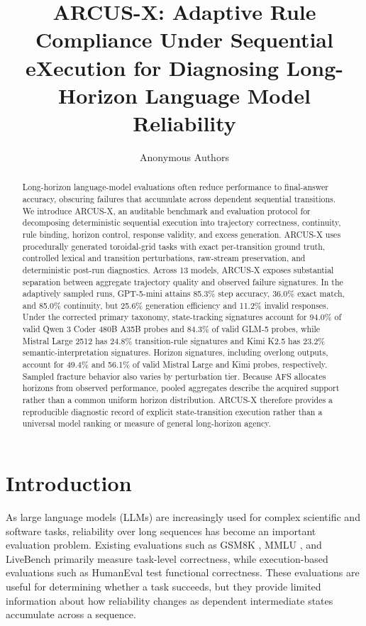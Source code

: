 \documentclass{article}
\title{ARCUS-X: Adaptive Rule Compliance Under Sequential eXecution for Diagnosing Long-Horizon Language Model Reliability}
\author{Anonymous Authors}
\begin{document}
\maketitle

\begin{abstract}
Long-horizon language-model evaluations often reduce performance to final-answer accuracy, obscuring failures that accumulate across dependent sequential transitions. We introduce ARCUS-X, an auditable benchmark and evaluation protocol for decomposing deterministic sequential execution into trajectory correctness, continuity, rule binding, horizon control, response validity, and excess generation. ARCUS-X uses procedurally generated toroidal-grid tasks with exact per-transition ground truth, controlled lexical and transition perturbations, raw-stream preservation, and deterministic post-run diagnostics. Across 13 models, ARCUS-X exposes substantial separation between aggregate trajectory quality and observed failure signatures. In the adaptively sampled runs, GPT-5-mini attains 85.3\% step accuracy, 36.0\% exact match, and 85.0\% continuity, but 25.6\% generation efficiency and 11.2\% invalid responses. Under the corrected primary taxonomy, state-tracking signatures account for 94.0\% of valid Qwen 3 Coder 480B A35B probes and 84.3\% of valid GLM-5 probes, while Mistral Large 2512 has 24.8\% transition-rule signatures and Kimi K2.5 has 23.2\% semantic-interpretation signatures. Horizon signatures, including overlong outputs, account for 49.4\% and 56.1\% of valid Mistral Large and Kimi probes, respectively. Sampled fracture behavior also varies by perturbation tier. Because AFS allocates horizons from observed performance, pooled aggregates describe the acquired support rather than a common uniform horizon distribution. ARCUS-X therefore provides a reproducible diagnostic record of explicit state-transition execution rather than a universal model ranking or measure of general long-horizon agency.

\end{abstract}

\section{Introduction}

As large language models (LLMs) are increasingly used for complex scientific and software tasks, reliability over long sequences has become an important evaluation problem. Existing evaluations such as GSM8K \cite{cobbe2021gsm8k}, MMLU \cite{hendrycks2020mmlu}, and LiveBench \cite{gu2024livebench} primarily measure task-level correctness, while execution-based evaluations such as HumanEval \cite{chen2021evaluating} test functional correctness. These evaluations are useful for determining whether a task succeeds, but they provide limited information about how reliability changes as dependent intermediate states accumulate across a sequence.
\end{document}

